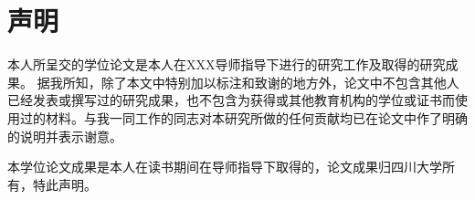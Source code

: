 
\chapter{声明}
本人所呈交的学位论文是本人在XXX导师指导下进行的研究工作及取得的研究成果。
据我所知，除了本文中特别加以标注和致谢的地方外，论文中不包含其他人已经发表或撰写过的研究成果，也不包含为获得{\universityname}或其他教育机构的学位或证书而使用过的材料。与我一同工作的同志对本研究所做的任何贡献均已在论文中作了明确的说明并表示谢意。

本学位论文成果是本人在{\universityname}读书期间在导师指导下取得的，论文成果归四川大学所有，特此声明。
\vspace{4cm}
\autograph
